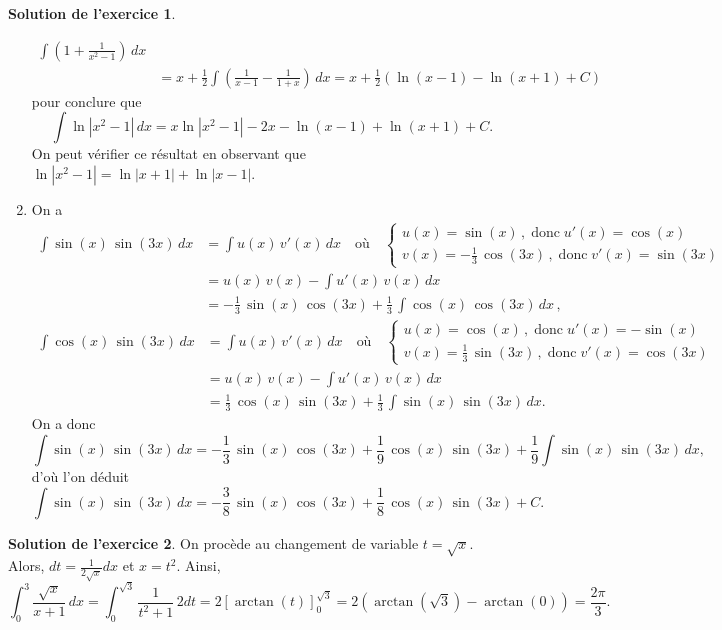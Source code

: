 \documentclass[a4paper, 11pt,openany]{article}%
\theoremstyle{plain}
\theoremstyle{definition}
\newtheorem{exo}{Exercice}
\newtheorem{sol}{Solution de l'exercice}
\theoremstyle{remark}
\begin{document}
\begin{sol}
\begin{enumerate}
\begin{align*}
  \int \left(1 + \frac{1}{x^2-1} \right)\, dx\\
&= x + \frac{1}{2} \int \left(\frac{1}{x-1}
  -\frac{1}{1+x}\right)\, dx=x + \frac{1}{2} \left(\ln(x-1) -\ln(x+1) + C\right)
\end{align*}
pour conclure que
\[
\int \ln|x^2-1|\, dx = x \ln|x^2-1| - 2x - \ln(x-1) + \ln(x+1)
+ C.
\]
On peut vérifier ce résultat en observant que $\ln|x^2-1|
=\ln|x+1| + \ln|x-1|$.
\item On a
\begin{align*}\int \sin(x)\, \sin(3x)\, dx &= \int u(x)\, v'(x)\, dx 
\quad \text{où}\quad \begin{cases}
 u(x)=\sin(x)\,,\;\text{donc}\; u'(x)=\cos(x) \\
 v(x)=-\frac{1}{3}\, \cos(3x)\,,\;\text{donc}\;v'(x)=\sin(3x)\end{cases}\\
&=u(x)\,v(x)-\int u'(x)\, v(x)\, dx\\
&= -\frac{1}{3}\,\sin(x)\, \cos(3x) +\frac{1}{3}\, \int\cos(x)\, \cos(3x) \,dx\,,
\end{align*}
\begin{align*}\int \cos(x)\, \sin(3x)\, dx &= \int u(x)\, v'(x)\, dx \quad \text{où}\quad \begin{cases}
 u(x)=\cos(x)\,,\;\text{donc}\; u'(x)=-\sin(x) \\
 v(x)=\frac{1}{3}\, \sin(3x)\,,\;\text{donc}\;v'(x)=\cos(3x)\end{cases}\\
&=u(x)\,v(x)-\int u'(x)\, v(x)\, dx\\
&= \frac{1}{3}\,\cos(x)\, \sin(3x) +\frac{1}{3}\, \int\sin(x)\, \sin(3x) \,dx.
\end{align*}
On a donc  
\[
\int \sin(x)\, \sin(3x)\, dx =-\frac{1}{3}\,\sin(x)\,
\cos(3x)+\frac{1}{9}\,\cos(x)\, \sin(3x) +\frac{1}{9} \int\sin(x)\,
\sin(3x) \,dx,
\]
d'où l'on déduit
\[
\int \sin(x)\, \sin(3x)\, dx=-\frac{3}{8}\,\sin(x)\, \cos(3x)+\frac{1}{8}\,\cos(x)\, \sin(3x)+C.
\]
\end{enumerate}
\end{sol}



\begin{sol}
On procède au changement de variable $t = \sqrt{x}$. Alors, $dt = \frac{1}{2\sqrt{x}} dx$ et $x = t^2$. Ainsi,
\[ \int_0^3 \frac{\sqrt{x}}{x +1} \, dx = 
\int_{0}^{\sqrt{3}} \frac{1}{t^2 + 1} \, 2 dt =  2 [ \arctan(t)]_{0}^{\sqrt{3}} = 2(\arctan(\sqrt{3}) - \arctan(0) ) = \frac{2\pi}{3}.\]
\end{sol}
\end{document}
